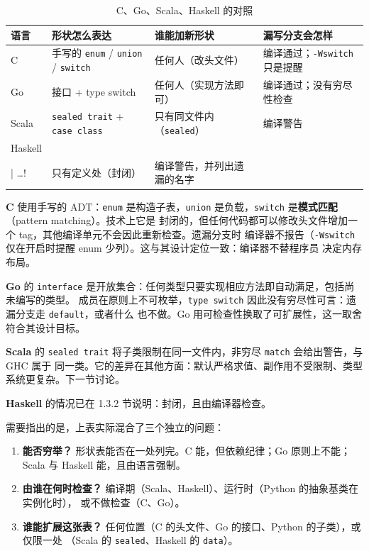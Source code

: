{\footnotesize\setlength{\tabcolsep}{4pt} %
\begin{longtable}[]{@{}
  l
  l
  l
  l@{}}
\caption{C、Go、Scala、Haskell 的对照}\label{tab:1-3}\\
\toprule\noalign{}
\textbf{语言} & \textbf{形状怎么表达} & \textbf{谁能加新形状} & \textbf{漏写分支会怎样} \\
\midrule\noalign{}
\endhead
\bottomrule\noalign{}
\endlastfoot
C & 手写的 \passthrough{\lstinline!enum!} / \passthrough{\lstinline!union!} / \passthrough{\lstinline!switch!} & 任何人（改头文件） & 编译通过；\passthrough{\lstinline!-Wswitch!} 只是提醒 \\
Go & 接口 + type switch & 任何人（实现方法即可） & 编译通过；没有穷尽性检查 \\
Scala & \passthrough{\lstinline!sealed trait!} + \passthrough{\lstinline!case class!} & 只有同文件内（\passthrough{\lstinline!sealed!}） & 编译警告 \\
Haskell & \passthrough{\lstinline!data Expr = Lit Int \\| …!} & 只有定义处（封闭） & 编译警告，并列出遗漏的名字 \\
\end{longtable}
}

\textbf{C} 使用手写的 ADT：\passthrough{\lstinline!enum!} 是构造子表，\passthrough{\lstinline!union!} 是负载，\passthrough{\lstinline!switch!} 是\textbf{模式匹配}（pattern matching）。技术上它是
封闭的，但任何代码都可以修改头文件增加一个 tag，其他编译单元不会因此重新检查。遗漏分支时
编译器不报告（\passthrough{\lstinline!-Wswitch!} 仅在开启时提醒 enum 少列）。这与其设计定位一致：编译器不替程序员
决定内存布局。

\textbf{Go} 的 \passthrough{\lstinline!interface!} 是开放集合：任何类型只要实现相应方法即自动满足，包括尚未编写的类型。
成员在原则上不可枚举，\passthrough{\lstinline!type switch!} 因此没有穷尽性可言：遗漏分支走 \passthrough{\lstinline!default!}，或者什么
也不做。Go 用可检查性换取了可扩展性，这一取舍符合其设计目标。

\textbf{Scala} 的 \passthrough{\lstinline!sealed trait!} 将子类限制在同一文件内，非穷尽 \passthrough{\lstinline!match!} 会给出警告，与 GHC 属于
同一类。它的差异在其他方面：默认严格求值、副作用不受限制、类型系统更复杂。下一节讨论。

\textbf{Haskell} 的情况已在 1.3.2 节说明：封闭，且由编译器检查。

需要指出的是，上表实际混合了三个独立的问题：

\begin{enumerate}
\def\labelenumi{\arabic{enumi}.}
\tightlist
\item
  \textbf{能否穷举？} 形状表能否在一处列完。C 能，但依赖纪律；Go 原则上不能；Scala 与 Haskell
  能，且由语言强制。
\item
  \textbf{由谁在何时检查？} 编译期（Scala、Haskell）、运行时（Python 的抽象基类在实例化时），
  或不做检查（C、Go）。
\item
  \textbf{谁能扩展这张表？} 任何位置（C 的头文件、Go 的接口、Python 的子类），或仅限一处
  （Scala 的 \passthrough{\lstinline!sealed!}、Haskell 的 \passthrough{\lstinline!data!}）。
\end{enumerate}

